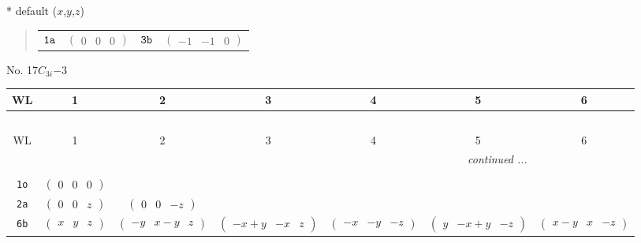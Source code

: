 \documentclass[fleqn,9pt,landscape]{jsarticle}
\begin{document}
* default ($x$,$y$,$z$)
\begin{quote}
\begin{tabular}{cccc}
$ {\tt 1a} $ & $ \begin{pmatrix} 0 & 0 & 0 \end{pmatrix} $ & $ {\tt 3b} $ & $ \begin{pmatrix} -1 & -1 & 0 \end{pmatrix} $
\end{tabular}
\end{quote}
\newpage
No. 17\quad$C_{3i}$\quad$-3$\quad[ trigonal ]
\begin{center}
\renewcommand{\arraystretch}{1.2}
\begin{longtable}{ccccccc}
 \hline \hline
WL & 1 & 2 & 3 & 4 & 5 & 6 \\ \hline \endfirsthead

\multicolumn{6}{l}{\tablename\ \thetable{}} \\
 \hline \hline
WL & 1 & 2 & 3 & 4 & 5 & 6 \\ \hline \endhead

 \hline \hline
\multicolumn{6}{r}{\footnotesize\it continued ...} \\ \endfoot

 \hline \hline
\multicolumn{6}{r}{} \\ \endlastfoot

{\tt 1o} & $ \begin{pmatrix} 0 & 0 & 0 \end{pmatrix} $ & $  $ & $  $ & $  $ & $  $ & $  $ \\ \hline
{\tt 2a} & $ \begin{pmatrix} 0 & 0 & z \end{pmatrix} $ & $ \begin{pmatrix} 0 & 0 & - z \end{pmatrix} $ & $  $ & $  $ & $  $ & $  $ \\ \hline
{\tt 6b} & $ \begin{pmatrix} x & y & z \end{pmatrix} $ & $ \begin{pmatrix} - y & x - y & z \end{pmatrix} $ & $ \begin{pmatrix} - x + y & - x & z \end{pmatrix} $ & $ \begin{pmatrix} - x & - y & - z \end{pmatrix} $ & $ \begin{pmatrix} y & - x + y & - z \end{pmatrix} $ & $ \begin{pmatrix} x - y & x & - z \end{pmatrix} $ \\
\end{longtable}
\end{center}
\end{document}
